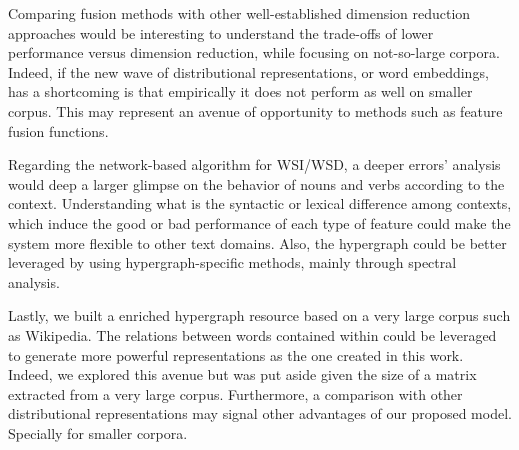 Comparing fusion methods with other well-established dimension reduction approaches would be interesting to understand the trade-offs of lower performance versus dimension reduction, while focusing on not-so-large corpora. Indeed, if the new wave of distributional representations, or word embeddings, has a shortcoming is that empirically it does not perform as well on smaller corpus. This may represent an avenue of opportunity to methods such as feature fusion functions.


Regarding the network-based algorithm for WSI/WSD, a deeper errors' analysis would deep a larger glimpse on the behavior of nouns and verbs according to the context. Understanding what is the syntactic or lexical difference among contexts, which induce the good or bad performance of each type of feature could make the system more flexible to other text domains. Also, the hypergraph could be better leveraged by using hypergraph-specific methods, mainly through spectral analysis.

Lastly, we built a enriched hypergraph resource based on a very large corpus such as Wikipedia. The relations between words contained within could be leveraged to generate more powerful representations as the one created in this work. Indeed, we explored this avenue but was put aside given the size of a matrix extracted from a very large corpus. Furthermore, a comparison with other distributional representations may signal other advantages of our proposed model. Specially for smaller corpora. 


